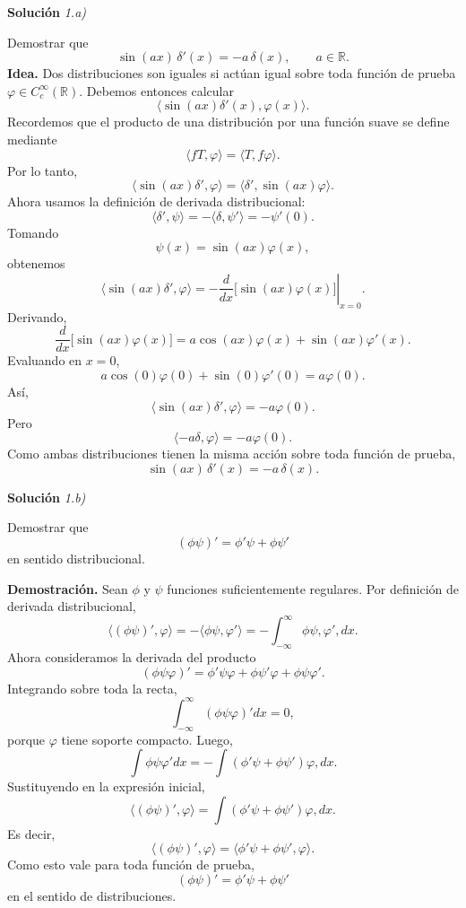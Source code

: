 \documentclass[11pt,spanish]{article}
\begin{document}
\vspace{0.5cm}
{\bf Soluci\'on }{\em 1.a)}
\vspace{0.5cm}

Demostrar que
$$
\sin(ax)\,\delta'(x)=-a\,\delta(x),
\qquad a\in\mathbb R.
$$
{\bf Idea.}
Dos distribuciones son iguales si actúan igual sobre toda función de prueba $\varphi\in C_c^\infty(\mathbb R)$.
Debemos entonces calcular
$$
\langle \sin(ax)\delta'(x),\varphi(x)\rangle .
$$
Recordemos que el producto de una distribución por una función suave se define mediante
$$
\langle fT,\varphi\rangle
=
\langle T,f\varphi\rangle .
$$
Por lo tanto,
$$
\langle \sin(ax)\delta',\varphi\rangle
=
\langle \delta',\sin(ax)\varphi\rangle .
$$
Ahora usamos la definición de derivada distribucional:
$$
\langle \delta',\psi\rangle
=
-\langle \delta,\psi'\rangle
=
-\psi'(0).
$$
Tomando
$$
\psi(x)=\sin(ax)\varphi(x),
$$
obtenemos
$$
\langle \sin(ax)\delta',\varphi\rangle
=
-\left.
\frac{d}{dx}
\bigl[\sin(ax)\varphi(x)\bigr]
\right|_{x=0}.
$$
Derivando,
$$
\frac{d}{dx}
\bigl[\sin(ax)\varphi(x)\bigr]
=
a\cos(ax)\varphi(x)
+
\sin(ax)\varphi'(x).
$$
Evaluando en $x=0$,
$$
a\cos(0)\varphi(0)
+
\sin(0)\varphi'(0)
=
a\varphi(0).
$$
Así,
$$
\langle \sin(ax)\delta',\varphi\rangle
=
-a\varphi(0).
$$
Pero
$$
\langle -a\delta,\varphi\rangle
=
-a\varphi(0).
$$
Como ambas distribuciones tienen la misma acción sobre toda función de prueba,
$$
\boxed{\sin(ax)\,\delta'(x)=-a\,\delta(x)}.
$$

\vspace{0.5cm}
{\bf Soluci\'on }{\em 1.b)}
\vspace{0.5cm}

Demostrar que
$$
(\phi\psi)'=\phi'\psi+\phi\psi'
$$
en sentido distribucional.

{\bf Demostración.}
Sean $\phi$ y $\psi$ funciones suficientemente regulares.
Por definición de derivada distribucional,
$$
\langle (\phi\psi)',\varphi\rangle
=
-\langle \phi\psi,\varphi'\rangle
=
-\int_{-\infty}^{\infty}
\phi\psi,\varphi',dx.
$$
Ahora consideramos la derivada del producto
$$
(\phi\psi\varphi)'
=
\phi'\psi\varphi
+
\phi\psi'\varphi
+
\phi\psi\varphi'.
$$
Integrando sobre toda la recta,
$$
\int_{-\infty}^{\infty}
(\phi\psi\varphi)'dx
=
0,
$$
porque $\varphi$ tiene soporte compacto.
Luego,
$$
\int \phi\psi\varphi' dx
=
-\int
(\phi'\psi+\phi\psi')\varphi,dx.
$$
Sustituyendo en la expresión inicial,
$$
\langle (\phi\psi)',\varphi\rangle
=
\int
(\phi'\psi+\phi\psi')\varphi,dx.
$$
Es decir,
$$
\langle (\phi\psi)',\varphi\rangle
=
\langle
\phi'\psi+\phi\psi',
\varphi
\rangle .
$$
Como esto vale para toda función de prueba,
$$
\boxed{
(\phi\psi)'=\phi'\psi+\phi\psi'
}
$$
en el sentido de distribuciones.
\end{document}
